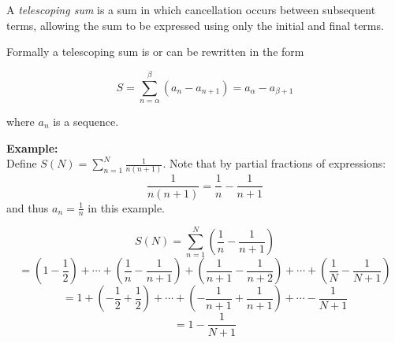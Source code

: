\documentclass[12pt]{article}
\begin{document}
A {\em telescoping sum} is a sum in which cancellation occurs between subsequent terms, allowing the sum to be expressed using only the initial and final terms.

Formally a telescoping sum is or can be rewritten in the form

$$ S= \sum_{n=\alpha}^{\beta}\left(a_n - a_{n+1}\right) = a_\alpha - a_{\beta+1}$$

where $a_n$ is a sequence.

{\bf Example:}\\

Define $S(N) = \sum_{n=1}^{N} \frac{1}{n(n+1)}$.  Note that by partial fractions of expressions:
\[ \frac{1}{n(n+1)}= \frac{1}{n} - \frac{1}{n+1} \] and thus $a_n = \frac{1}{n}$ in this example.

\[ S(N) = \sum_{n=1}^{N} \left( \frac{1}{n} - \frac{1}{n+1} \right) \]
\[  = \left( 1 - \frac{1}{2} \right)
      + \cdots + \left( \frac{1}{n} - \frac{1}{n+1} \right) +
      \left( \frac{1}{n+1} - \frac{1}{n+2} \right)
      + \cdots + \left( \frac{1}{N} - \frac{1}{N+1} \right) \]
\[  = 1 + \left( - \frac{1}{2} + \frac{1}{2} \right)
      + \cdots + \left( -\frac{1}{n+1} +\frac{1}{n+1} \right)
      + \cdots - \frac{1}{N+1} \]
\[  = 1 - \frac{1}{N+1} \]
\end{document}
